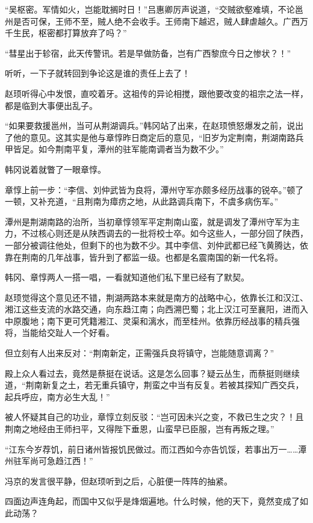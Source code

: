 “吴枢密。军情如火，岂能耽搁时日！”吕惠卿厉声说道，“交贼欲壑难填，不论邕州是否可保，王师不至，贼人绝不会收手。王师南下越迟，贼人肆虐越久。广西万千生民，枢密都打算放弃了吗？”

“彗星出于轸宿，此天传警讯。若是早做防备，岂有广西黎庶今日之惨状？！”

听听，一下子就转回到争论这是谁的责任上去了！

赵顼听得心中发恨，直咬着牙。这祖传的异论相搅，跟他要改变的祖宗之法一样，都是临到大事便出乱子。

“如果要救援邕州，当可从荆湖调兵。”韩冈站了出来，在赵顼愤怒爆发之前，说出了他的意见。这其实是他与章惇昨日商定后的意见，“旧岁为定荆南，荆湖南路兵甲皆足。如今荆南平复，潭州的驻军能南调者当为数不少。”

韩冈说着就瞥了一眼章惇。

章惇上前一步：“李信、刘仲武皆为良将，潭州守军亦颇多经历战事的锐卒。”顿了一顿，又补充道，“且荆南为瘴疠之地，从此路调兵南下，不虞多病伤军。”

潭州是荆湖南路的治所，当初章惇领军平定荆南山蛮，就是调发了潭州守军为主力，不过核心则还是从陕西调去的一批将校士卒。如今这些人，一部分回了陕西，一部分被调往他处，但剩下的也为数不少。其中李信、刘仲武都已经飞黄腾达，依靠在荆南的几年战事，皆升到了都监一级。也都是名震南国的新一代名将。

韩冈、章惇两人一搭一唱，一看就知道他们私下里已经有了默契。

赵顼觉得这个意见还不错，荆湖两路本来就是南方的战略中心，依靠长江和汉江、湘江这些支流的水路交通，向东趋江南；向西溯巴蜀；北上汉江可至襄阳，进而入中原腹地；南下更可凭籍湘江、灵渠和漓水，而至桂州。依靠历经战事的精兵强将，当能给交趾人一个好看。

但立刻有人出来反对：“荆南新定，正需强兵良将镇守，岂能随意调离？”

殿上众人看过去，竟然是蔡挺在说话。这是怎么回事？疑云丛生，而蔡挺则继续道，“荆南新复之土，若无重兵镇守，荆蛮之中当有反复。若被其探知广西交兵，起兵呼应，南方必生大乱！”

被人怀疑其自己的功业，章惇立刻反驳：“岂可因未兴之变，不救已生之灾？！且荆南之地经由王师扫平，又得陛下垂恩，山蛮早已臣服，岂有再叛之理。”

“江东今岁荐饥，前日诸州皆报饥民做过。而江西如今亦告饥馁，若事出万一……潭州驻军尚可急趋江西！”

冯京的发言很平静，但赵顼听到之后，心脏便一阵阵的抽紧。

四面边声连角起，而国中又似乎是烽烟遍地。什么时候，他的天下，竟然变成了如此动荡？

